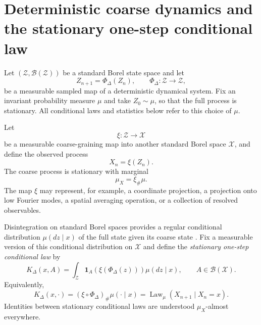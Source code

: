 \documentclass[final,hidelinks]{siamart251216}
\newcommand{\cZ}{\mathcal{Z}}
\newcommand{\cX}{\mathcal{X}}
\newcommand{\cB}{\mathcal{B}}
\newcommand{\Law}{\operatorname{Law}}
\begin{document}
\section{Deterministic coarse dynamics and the stationary one-step conditional law}
\label{sec:setting}

Let $(\cZ,\cB(\cZ))$ be a standard Borel state space and let
\begin{equation}
    Z_{n+1}=\Phi_\Delta(Z_n),
    \qquad
    \Phi_\Delta:\cZ\to\cZ,
    \label{eq:full_dynamics}
\end{equation}
be a measurable sampled map of a deterministic dynamical system.
Fix an invariant probability measure $\mu$ and take $Z_0\sim\mu$,
so that the full process is stationary. All conditional laws and
statistics below refer to this choice of $\mu$.

Let
\begin{equation}
    \xi:\cZ\to\cX
    \label{eq:coarse_map}
\end{equation}
be a measurable coarse-graining map into another standard Borel space
$\cX$, and define the observed process
\begin{equation}
    X_n=\xi(Z_n).
    \label{eq:coarse_process}
\end{equation}
The coarse process is stationary with marginal
\begin{equation}
    \mu_X=\xi_\#\mu.
    \label{eq:coarse_marginal}
\end{equation}
The map $\xi$ may represent, for example, a
coordinate projection, a projection onto low Fourier modes, a spatial
averaging operation, or a collection of resolved observables.

Disintegration on standard Borel spaces provides a regular conditional
distribution $\mu(dz\mid x)$ of the full state given its coarse state
\cite{kallenberg2021,changpollard1997}. Fix a measurable version of this
conditional distribution on $\cX$ and define the
\emph{stationary one-step conditional law} by
\begin{equation}
    \boxed{
    K_\Delta(x,A)
    =
    \int_{\cZ}
    \mathbf 1_A\!\left(\xi(\Phi_\Delta(z))\right)
    \mu(dz\mid x),
    }
    \qquad
    A\in\cB(\cX).
    \label{eq:projected_kernel}
\end{equation}
Equivalently,
\begin{equation}
    K_\Delta(x,\cdot)
    =
    (\xi\circ\Phi_\Delta)_\#
    \mu(\cdot\mid x)
    =
    \Law_\mu(X_{n+1}\mid X_n=x).
    \label{eq:conditional_law}
\end{equation}
Identities between stationary conditional laws are understood
$\mu_X$-almost everywhere.
\end{document}

